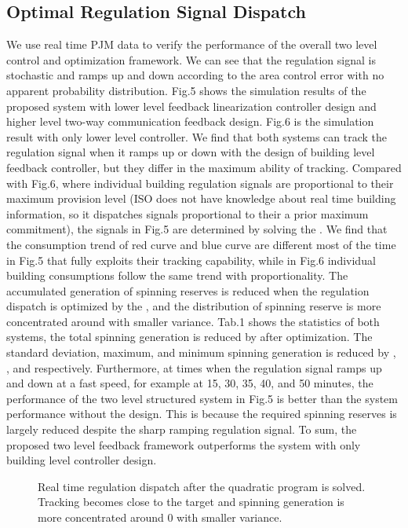 \documentclass[journal]{IEEEtran}
\begin{document}
\subsection{Optimal Regulation Signal Dispatch}
We use real time PJM data \cite{realsignal} to verify the performance of the overall two level control and optimization framework. We can see that the regulation signal is stochastic and ramps up and down according to the area control error with no apparent probability distribution. Fig.5 shows the simulation results of the proposed system with lower level feedback linearization controller design and higher level two-way communication feedback design. Fig.6 is the simulation result with only lower level controller. We find that both systems can track the regulation signal when it ramps up or down with the design of building level feedback controller, but they differ in the maximum ability of tracking. Compared with Fig.6, where individual building regulation signals are proportional to their maximum provision level (ISO does not have knowledge about real time building information, so it dispatches signals proportional to their a prior maximum commitment), the signals in Fig.5 are determined by solving the . We find that the consumption trend of red curve and blue curve are different most of the time in Fig.5 that fully exploits their tracking capability, while in Fig.6 individual building consumptions follow the same trend with proportionality. The accumulated generation of spinning reserves is reduced when the regulation dispatch is optimized by the , and the distribution of spinning reserve is more concentrated around  with smaller variance. Tab.1 shows the statistics of both systems, the total spinning generation is reduced by  after optimization. The standard deviation, maximum, and minimum spinning generation is reduced by , , and  respectively. Furthermore, at times when the regulation signal ramps up and down at a fast speed, for example at 15, 30, 35, 40, and 50 minutes, the performance of the two level structured system in Fig.5 is better than the system performance without the design. This is because the required spinning reserves is largely reduced despite the sharp ramping regulation signal. To sum, the proposed two level feedback framework outperforms the system with only building level controller design.
\begin{figure}[hbt]
\centering
{}
\label{opt_result}
\caption{Real time regulation dispatch after the quadratic program is solved. Tracking becomes close to the target and spinning generation is more concentrated around 0 with smaller variance.}
\end{figure}
\end{document}
